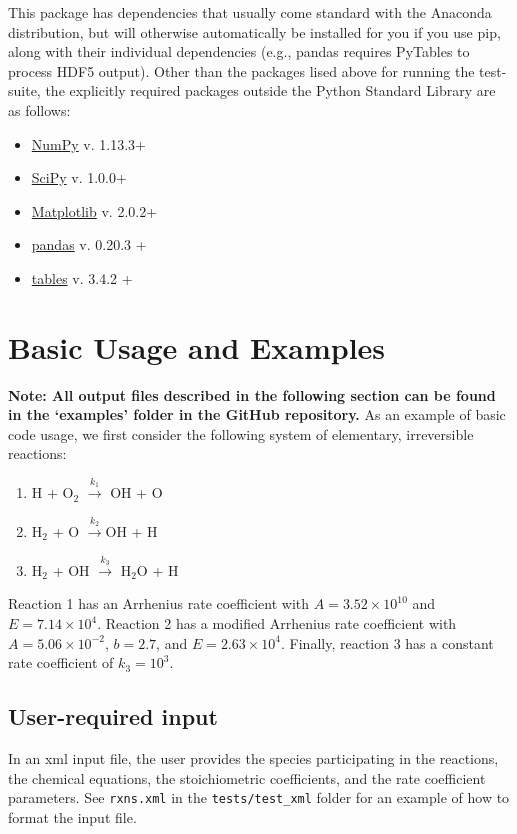 \documentclass[12pt]{article}
\begin{document}
This package has dependencies that usually come standard with the Anaconda distribution, but will otherwise automatically be installed for you if you use pip, along with their individual dependencies (e.g., pandas requires PyTables to process HDF5 output). Other than the packages lised above for running the test-suite, the explicitly required packages outside the Python Standard Library are as follows: 
\begin{itemize}
\item \href{http://www.numpy.org/}{NumPy} v. 1.13.3+
\item \href{https://www.scipy.org/}{SciPy} v. 1.0.0+
\item \href{https://pandas.pydata.org/} {Matplotlib} v. 2.0.2+
\item \href{https://matplotlib.org/api/pyplot_api.html} {pandas} v. 0.20.3 +
\item
\href{http://www.pytables.org} {tables} v. 3.4.2 +
\end{itemize}

\section{Basic Usage and Examples}
\textbf{Note: All output files described in the following section can be found in the `examples' folder in the GitHub repository.}
As an example of basic code usage, we first consider the following system of elementary, irreversible reactions:

\begin{enumerate}
\item H + O$_2$ $\overset{k_1}{\rightarrow}$ OH + O
\item H$_2$ + O $\overset{k_2}{\rightarrow}$OH + H
\item H$_2$ + OH $\overset{k_3}{\rightarrow}$ H$_2$O + H
\end{enumerate}

Reaction 1 has an Arrhenius rate coefficient with $A = 3.52\times 10^{10}$ and $E = 7.14\times 10^4$. Reaction 2 has a modified Arrhenius rate coefficient with $A = 5.06\times 10^{-2}$, $b = 2.7$, and $E = 2.63\times10^4$. Finally, reaction 3 has a constant rate coefficient of $k_3 = 10^3$.



\subsection{User-required input}
In an xml input file, the user provides the species participating in the reactions, the chemical equations, the stoichiometric coefficients, and the rate coefficient parameters. See {\tt rxns.xml} in the {\tt tests/test\_xml} folder for an example of how to format the input file. 
\end{document}
